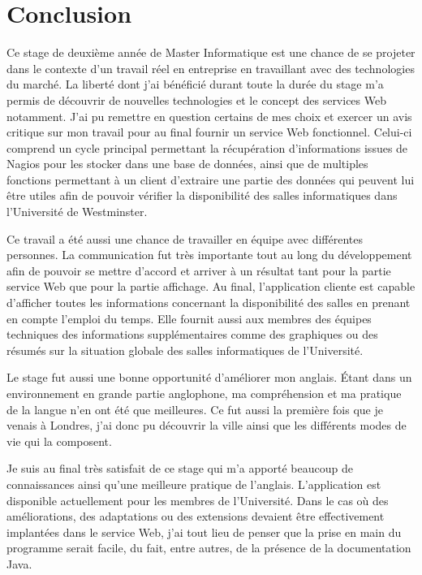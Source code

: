 \chapter{Conclusion}

Ce stage de deuxi\`eme ann\'ee de Master Informatique est une chance de se projeter dans le contexte d'un travail r\'eel en entreprise en travaillant avec des technologies du march\'e.
La libert\'e dont j'ai b\'en\'efici\'e durant toute la dur\'ee du stage m'a permis de d\'ecouvrir de nouvelles technologies et le concept des services Web notamment.
J'ai pu remettre en question certains de mes choix et exercer un avis critique sur mon travail pour au final fournir un service Web fonctionnel.
Celui-ci comprend un cycle principal permettant la r\'ecup\'eration d'informations issues de Nagios pour les stocker dans une base de donn\'ees, ainsi que de multiples fonctions permettant \`a un client d'extraire une partie des donn\'ees qui peuvent lui \^etre utiles afin de pouvoir v\'erifier la disponibilit\'e des salles informatiques dans l'Universit\'e de Westminster.

Ce travail a \'et\'e aussi une chance de travailler en \'equipe avec diff\'erentes personnes.
La communication fut tr\`es importante tout au long du d\'eveloppement afin de pouvoir se mettre d'accord et arriver \`a un r\'esultat tant pour la partie service Web que pour la partie affichage.
Au final, l'application cliente est capable d'afficher toutes les informations concernant la disponibilit\'e des salles en prenant en compte l'emploi du temps.
Elle fournit aussi aux membres des \'equipes techniques des informations suppl\'ementaires comme des graphiques ou des r\'esum\'es sur la situation globale des salles informatiques de l'Universit\'e.

Le stage fut aussi une bonne opportunit\'e d'am\'eliorer mon anglais.
\'Etant dans un environnement en grande partie anglophone, ma compr\'ehension et ma pratique de la langue n'en ont \'et\'e que meilleures.
Ce fut aussi la premi\`ere fois que je venais \`a Londres, j'ai donc pu d\'ecouvrir la ville ainsi que les diff\'erents modes de vie qui la composent.

Je suis au final tr\`es satisfait de ce stage qui m'a apport\'e beaucoup de connaissances ainsi qu'une meilleure pratique de l'anglais.
L'application est disponible actuellement pour les membres de l'Universit\'e.
Dans le cas o\`u des am\'eliorations, des adaptations ou des extensions devaient \^etre effectivement implant\'ees dans le service Web, j'ai tout lieu de penser que la prise en main du programme serait facile, du fait, entre autres, de la pr\'esence de la documentation Java.

\clearpage
